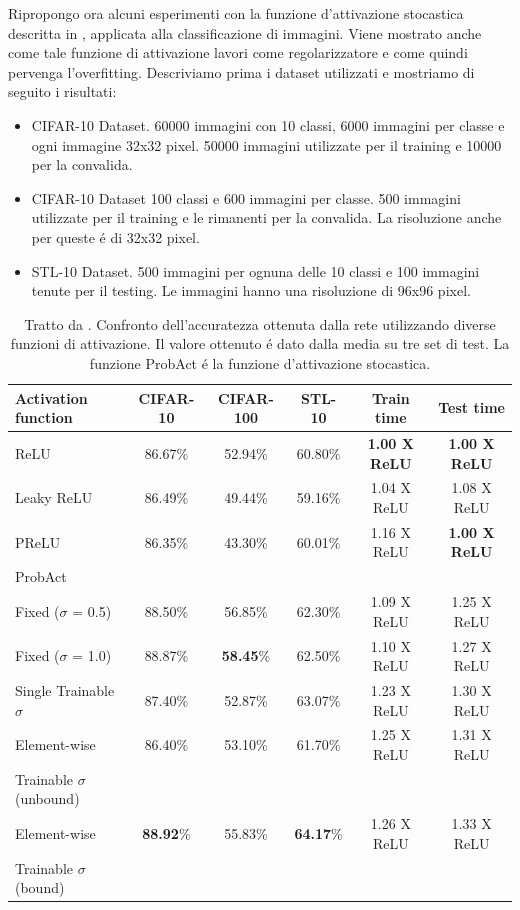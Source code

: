 \documentclass[a4paper,12pt]{report}
\begin{document}
 Ripropongo ora alcuni esperimenti con la funzione d'attivazione stocastica descritta in \cite{lee2019probact}, applicata alla classificazione di immagini. 
 Viene mostrato anche come tale funzione di attivazione lavori come regolarizzatore e come quindi pervenga l'overfitting. Descriviamo prima i dataset utilizzati e mostriamo di seguito i risultati:
 \begin{itemize}
  \item CIFAR-10 Dataset. 60000 immagini con 10 classi, 6000 immagini per classe e ogni immagine 32x32 pixel. 50000 immagini utilizzate per il training e 10000 per la convalida. 
  \item CIFAR-10 Dataset 100 classi e 600 immagini per classe. 500 immagini utilizzate per il training e le rimanenti per la convalida. La risoluzione anche per queste \'e di 32x32 pixel. 
  \item STL-10 Dataset. 500 immagini per ognuna delle 10 classi e 100 immagini tenute per il testing. Le immagini hanno una risoluzione di 96x96 pixel.
 \end{itemize}
 
 \begin{table}[h]\caption{Tratto da \cite{lee2019probact}. Confronto dell'accuratezza ottenuta dalla rete utilizzando diverse funzioni di attivazione. Il valore ottenuto \'e dato dalla media su tre set di test. La funzione ProbAct \'e la funzione d'attivazione stocastica.}\label{ActFuncTestTab}
   \centering
   \begin{tabular}[h]{|l|c|c|c|c|c|}
    \hline
   Activation function & CIFAR-10 & CIFAR-100 & STL-10 & Train time & Test time \\ \hline
   ReLU & 86.67\% & 52.94\% & 60.80\% & \textbf{1.00 X ReLU} & \textbf{1.00 X ReLU} \\ 
   Leaky ReLU & 86.49\% & 49.44\% & 59.16\% & 1.04 X ReLU & 1.08 X ReLU \\
   PReLU & 86.35\% & 43.30\% & 60.01\% & 1.16 X ReLU & \textbf{1.00 X ReLU} \\
   \hline
   ProbAct & & & & & \\
   \quad Fixed ($\sigma$ = 0.5) & 88.50\% & 56.85\% & 62.30\% & 1.09 X ReLU & 1.25 X ReLU \\
   \quad Fixed ($\sigma$ = 1.0) & 88.87\% & \textbf{58.45}\% & 62.50\% & 1.10 X ReLU & 1.27 X ReLU \\
   \quad Single Trainable $\sigma$ & 87.40\% & 52.87\% & 63.07\% & 1.23 X ReLU & 1.30 X ReLU \\
   \quad Element-wise & 86.40\% & 53.10\% & 61.70\% & 1.25 X ReLU & 1.31 X ReLU \\
   \qquad Trainable $\sigma$ (unbound)  & & & & & \\
   \quad Element-wise & \textbf{88.92}\% & 55.83\% & \textbf{64.17}\% & 1.26 X ReLU & 1.33 X ReLU \\
   \qquad Trainable $\sigma$ (bound)  & & & & & \\
   \hline
   \end{tabular}
  \end{table}
  
\end{document}
